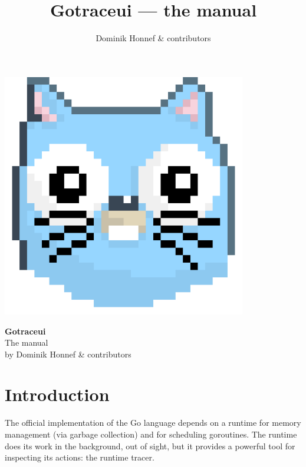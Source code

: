 \documentclass[10pt,letterpaper,oneside,openany,showtrims]{memoir}
\title{Gotraceui --- the manual}
\author{Dominik Honnef \& contributors}
\begin{document}
\frontmatter

\begin{titlingpage}
\centering
\includegraphics[width=0.8\textwidth]{./images/logo}

\begin{vplace}
{\HUGE\bfseries Gotraceui}\\[\baselineskip]
{\Huge The manual}\\[2\baselineskip]
{by Dominik Honnef \& contributors}
\end{vplace}
\end{titlingpage}

\tableofcontents
{}

\mainmatter


\chapter{Introduction}

The official implementation of the Go language depends on a runtime for memory management (via garbage collection) and for scheduling goroutines.
The runtime does its work in the background, out of sight, but it provides a powerful tool for inspecting its actions: the runtime tracer.
\end{document}
